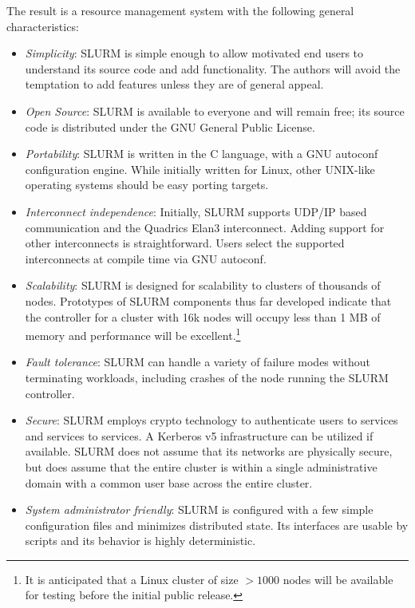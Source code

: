 The result is a resource management system with the following general
characteristics:

\begin{itemize}
\item {\em Simplicity}: SLURM is simple enough to allow motivated end users
to understand its source code and add functionality.  The authors will 
avoid the temptation to add features unless they are of general appeal. 

\item {\em Open Source}: SLURM is available to everyone and will remain free;
its source code is distributed under the GNU General Public License.

\item {\em Portability}: SLURM is written in the C language, with a GNU 
autoconf configuration engine.  While initially written for Linux, 
other UNIX-like operating systems should be easy porting targets.

\item {\em Interconnect independence}: Initially, SLURM supports UDP/IP based
communication and the Quadrics Elan3 interconnect.  Adding support for other
interconnects is straightforward.  Users select the supported interconnects
at compile time via GNU autoconf.

\item {\em Scalability}: SLURM is designed for scalability to clusters of
thousands of nodes.
Prototypes of SLURM components thus far developed indicate that the
controller for a cluster with 16k nodes will occupy less than 1 MB 
of memory and performance will be excellent.\footnote{It is anticipated 
that a Linux cluster of size $>1000$ nodes will be available for testing 
before the initial public release.}

\item {\em Fault tolerance}: SLURM can handle a variety of failure modes
without terminating workloads, including crashes of the node running the SLURM
controller.

\item {\em Secure}: SLURM employs crypto technology to authenticate 
users to services and services to services.  
A Kerberos v5 infrastructure can be utilized if available.
SLURM does not assume that its networks are physically secure, 
but does assume that the entire cluster is within a single 
administrative domain with a common user base across the 
entire cluster.

\item {\em System administrator friendly}: SLURM is configured with a few
simple configuration files and minimizes distributed state.  Its interfaces
are usable by scripts and its behavior is highly deterministic.

\end{itemize}

